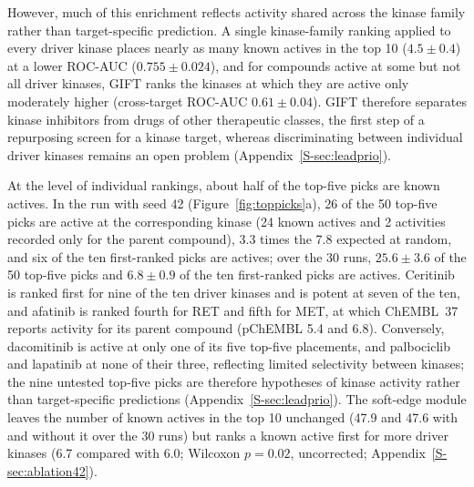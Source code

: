 \documentclass[10pt,letterpaper]{article}
\begin{document}
However, much of this enrichment reflects activity shared across the kinase family rather than target-specific prediction. A single kinase-family ranking applied to every driver kinase places nearly as many known actives in the top 10 ($4.5\pm0.4$) at a lower ROC-AUC ($0.755\pm0.024$), and for compounds active at some but not all driver kinases, GIFT ranks the kinases at which they are active only moderately higher (cross-target ROC-AUC $0.61\pm0.04$). GIFT therefore separates kinase inhibitors from drugs of other therapeutic classes, the first step of a repurposing screen for a kinase target, whereas discriminating between individual driver kinases remains an open problem (Appendix~\ref{S-sec:leadprio}).

At the level of individual rankings, about half of the top-five picks are known actives. In the run with seed 42 (Figure~\ref{fig:toppicks}a), 26 of the 50 top-five picks are active at the corresponding kinase (24 known actives and 2 activities recorded only for the parent compound), 3.3 times the 7.8 expected at random, and six of the ten first-ranked picks are actives; over the 30 runs, $25.6\pm3.6$ of the 50 top-five picks and $6.8\pm0.9$ of the ten first-ranked picks are actives. Ceritinib is ranked first for nine of the ten driver kinases and is potent at seven of the ten, and afatinib is ranked fourth for RET and fifth for MET, at which ChEMBL~37 reports activity for its parent compound (pChEMBL 5.4 and 6.8). Conversely, dacomitinib is active at only one of its five top-five placements, and palbociclib and lapatinib at none of their three, reflecting limited selectivity between kinases; the nine untested top-five picks are therefore hypotheses of kinase activity rather than target-specific predictions (Appendix~\ref{S-sec:leadprio}). The soft-edge module leaves the number of known actives in the top 10 unchanged (47.9 and 47.6 with and without it over the 30 runs) but ranks a known active first for more driver kinases (6.7 compared with 6.0; Wilcoxon $p=0.02$, uncorrected; Appendix~\ref{S-sec:ablation42}).
\end{document}
